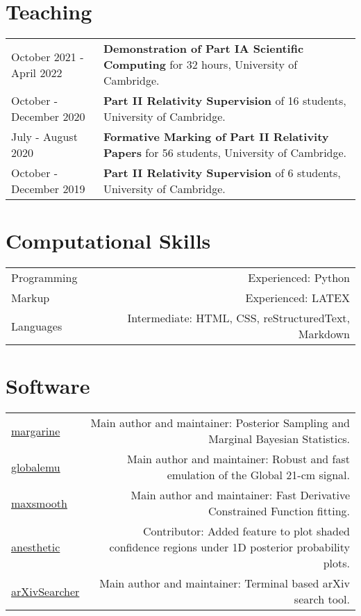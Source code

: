 \documentclass{article}
\begin{document}
\section*{Teaching}

\begin{tabular}{>{\raggedleft}p{}!{\vrule}p{0.76\textwidth}}
	October 2021 - April 2022 & \textbf{Demonstration of Part IA Scientific Computing} for 32 hours, University of Cambridge.\\
	October - December 2020 & \textbf{Part II Relativity Supervision} of 16 students,  University of Cambridge. \\
	July - August 2020 & \textbf{Formative Marking of Part II Relativity Papers} for 56 students, University of Cambridge. \\
	October - December 2019 & \textbf{Part II Relativity Supervision} of 6 students, University of Cambridge.
\end{tabular}

\section*{Computational Skills}

\begin{tabular}{L!{\vrule}R}
	Programming & Experienced: Python \\
	Markup & Experienced: LATEX \\
	Languages & Intermediate: HTML, CSS, reStructuredText, Markdown
\end{tabular}

\section*{Software}

\begin{tabular}{L!{\vrule}R}
	\href{https://github.com/htjb/margarine}{margarine} & Main author and maintainer: Posterior Sampling and Marginal Bayesian Statistics. \\
	\href{https://github.com/htjb/globalemu}{globalemu} & Main author and maintainer: Robust and fast emulation of the Global 21-cm signal.\\
	\href{https://github.com/htjb/maxsmooth}{maxsmooth} & Main author and maintainer: Fast Derivative Constrained Function fitting.\\
	\href{https://github.com/williamjameshandley/anesthetic}{anesthetic} & Contributor: Added feature to plot shaded confidence regions under 1D posterior probability plots.\\
	\href{https://github.com/htjb/arXivSearcher}{arXivSearcher} & Main author and maintainer: Terminal based arXiv search tool.
\end{tabular}
\end{document}
